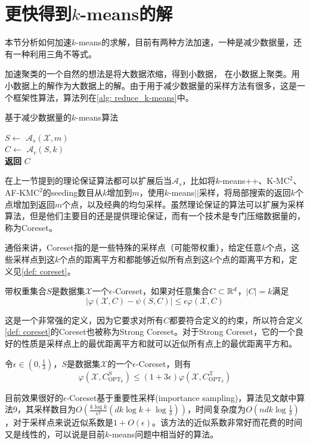 \section{更快得到\texorpdfstring{$k$}{k}-means的解}
本节分析如何加速$k$-means的求解，目前有两种方法加速，一种是减少数据量，还有一种利用三角不等式。

加速聚类的一个自然的想法是将大数据浓缩，得到小数据，
在小数据上聚类。用小数据上的解作为大数据上的解。由于用于减少数据量的采样方法有很多，这是一个框架性算法，算法列在\ref{alg: reduce_k-means}中。
\begin{algorithm}
    \caption{基于减少数据量的$k$-means算法}\label{alg: reduce_k-means}
    $S \gets$ $\mathcal{A}_s(\mathcal{X},m)$ \\
    $C \gets$ $\mathcal{A}_c(S,k)$ \\
    \textbf{返回} $C$
\end{algorithm}
在上一节提到的理论保证算法都可以扩展后当$\mathcal{A}_s$，比如将$k$-means++、K-M$\text{C}^2$、AF-KM$\text{C}^2$的seeding数目从$k$增加到$m$，使用$k$-means\(\vert \vert\)采样，将局部搜索的返回$k$个点增加到返回$m$个点，以及经典的均匀采样。虽然理论保证的算法可以扩展为采样算法，但是他们主要目的还是提供理论保证，而有一个技术是专门压缩数据量的，称为Coreset。

通俗来讲，Coreset指的是一些特殊的采样点（可能带权重），给定任意$k$个点，这些采样点到这$k$个点的距离平方和都能够近似所有点到这$k$个点的距离平方和，定义见\ref{def: coreset}。
\begin{definition}[常规Coreset]
    \label{def: coreset}
    带权重集合$S$是数据集$\mathcal{X}$一个$\epsilon$-Coreset，如果对任意集合$C \subset \mathbb{R}^d$，$|C|=k$满足
    \begin{equation*}
        |\varphi(\mathcal{X},C) - \psi (S,C)| \leq \epsilon \varphi(\mathcal{X},C)
    \end{equation*}
\end{definition}
这是一个非常强的定义，因为它要求对所有$C$都要符合定义的约束，所以符合定义\ref{def: coreset}的Coreset也被称为Strong Coreset。对于Strong Coreset，它的一个良好的性质是采样点上的最优距离平方和就可以近似所有点上的最优距离平方和。
\begin{corollary}[Coreset性质1]
    \label{cor: coreset_property1}
    令$\epsilon \in (0, \frac{1}{3})$，$S$是数据集$\mathcal{X}$的一个$\epsilon$-Coreset，则有
    \begin{equation*}
        \varphi(\mathcal{X},C_{\text{OPT}_k}^S) \leq (1+3\epsilon) \varphi(\mathcal{X},C_{\text{OPT}_k}^{\mathcal{X}})
    \end{equation*}
\end{corollary}
目前效果很好的$\epsilon$-Coreset基于重要性采样(importance sampling)，算法见文献\cite{bachem2018sampling}中算法9，其采样数目为$O(\frac{k\log k}{\epsilon^2}(dk\log k+\log\frac{1}{\delta}))$，时间复杂度为$O(ndk\log\frac{1}{\delta})$，对于采样点来说近似系数是$1+O(\epsilon)$。该方法的近似系数非常好而花费的时间又是线性的，可以说是目前$k$-means问题中相当好的算法。

